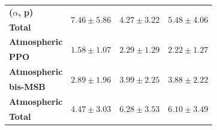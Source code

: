 \begin{table}
\begin{tabular}{lccc}
        \textbf{($\alpha$, p)} & \multirow{2}{*}{$7.46\pm5.86$} & \multirow{2}{*}{$4.27\pm3.22$} & \multirow{2}{*}{$5.48\pm4.06$} \\
        \textbf{Total} & & & \\
        \hline

        \textbf{Atmospheric} & \multirow{2}{*}{$1.58\pm1.07$} & \multirow{2}{*}{$2.29\pm1.29$} & \multirow{2}{*}{$2.22\pm1.27$} \\
        \textbf{PPO} & & & \\
        \hline

        \textbf{Atmospheric} & \multirow{2}{*}{$2.89\pm1.96$} & \multirow{2}{*}{$3.99\pm2.25$} & \multirow{2}{*}{$3.88\pm2.22$} \\
        \textbf{bis-MSB} & & & \\
        \hline

        \textbf{Atmospheric} & \multirow{2}{*}{$4.47\pm3.03$} & \multirow{2}{*}{$6.28\pm3.53$} & \multirow{2}{*}{$6.10\pm3.49$} \\
        \textbf{Total} & & & \\
        \hline

        \hline\hline
    \end{tabular}
\end{table}

